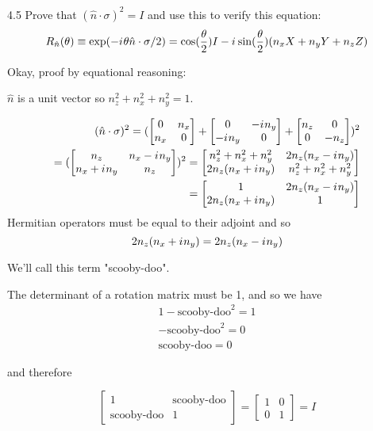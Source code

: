 \documentclass[12pt, letterpaper, twoside]{article}
\newcommand{\iu}{{i\mkern1mu}}
\newcommand{\twoXtwo}[4]{\begin{bmatrix}
    #1 & #3 \\
    #2 & #4
\end{bmatrix}}
\begin{document}
4.5 Prove that $(\hat{n} \cdot \sigma)^2 = I$ and use this to verify this equation:
$$
	R_{\hat{n}}(\theta) \equiv \exp(-\iu \theta \hat{n} \cdot \sigma/2) = \cos(\frac{\theta}{2})I - \iu \sin(\frac{\theta}{2})(n_xX + n_yY + n_zZ)
$$

Okay, proof by equational reasoning:

$\hat{n}$ is a unit vector so $n_z^2 + n_x^2 + n_y^2 = 1$.

\begin{subequations}
	\begin{align}
		(\hat{n} \cdot \sigma)^2 = (\twoXtwo{0}{n_x}{n_x}{0} + \twoXtwo{0}{-\iu n_y}{-\iu n_y}{0} + \twoXtwo{n_z}{0}{0}{-n_z})^2 \\
		= (\twoXtwo{n_z}{n_x + \iu n_y}{n_x - \iu n_y}{n_z})^2
		= \twoXtwo{n_z^2 + n_x^2 + n_y^2}{2n_z(n_x + \iu n_y)}{2n_z(n_x - \iu n_y)}{n_z^2 + n_x^2 + n_y^2}                       \\
		= \twoXtwo{1}{2n_z(n_x + \iu n_y)}{2n_z(n_x - \iu n_y)}{1}
	\end{align}
\end{subequations}
Hermitian operators must be equal to their adjoint and so
$$
	2n_z(n_x + \iu n_y) = 2n_z(n_x - \iu n_y)
$$

We'll call this term "scooby-doo".

The determinant of a rotation matrix must be 1, and so we have
\begin{subequations}
	\begin{align}
	1 - \text{scooby-doo}^2 = 1 \\
	- \text{scooby-doo}^2 = 0 \\
	\text{scooby-doo} = 0
\end{align}
\end{subequations}

and therefore

$$
	\twoXtwo{1}{\text{scooby-doo}}{\text{scooby-doo}}{1} = \twoXtwo{1}{0}{0}{1} = I
$$
\end{document}
